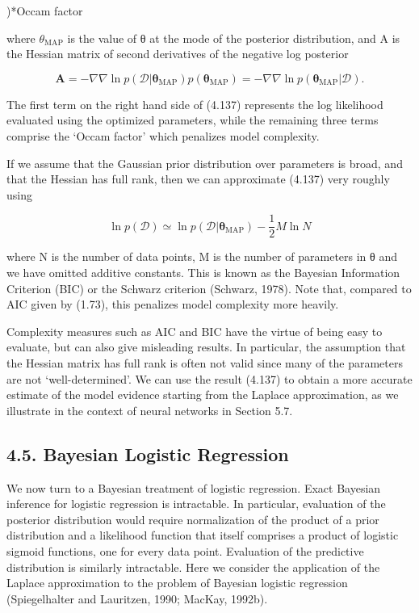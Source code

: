 \documentclass[
  10
]{article}
\begin{document}
)*Occam factor

where \(\theta _ { \mathrm { M A P } }\) is the value of θ at the mode
of the posterior distribution, and A is the Hessian matrix of second
derivatives of the negative log posterior

\[
\mathbf {A} = - \nabla \nabla \ln p (\mathcal {D} | \boldsymbol {\theta} _ {\mathrm{MAP}}) p (\boldsymbol {\theta} _ {\mathrm{MAP}}) = - \nabla \nabla \ln p (\boldsymbol {\theta} _ {\mathrm{MAP}} | \mathcal {D}).\tag{4.138}
\]

The first term on the right hand side of (4.137) represents the log
likelihood evaluated using the optimized parameters, while the remaining
three terms comprise the `Occam factor' which penalizes model
complexity.

If we assume that the Gaussian prior distribution over parameters is
broad, and that the Hessian has full rank, then we can approximate
(4.137) very roughly using

\[
\ln p (\mathcal {D}) \simeq \ln p (\mathcal {D} | \pmb {\theta} _ {\mathrm{MAP}}) - \frac {1}{2} M \ln N\tag{4.139}
\]

where N is the number of data points, M is the number of parameters in θ
and we have omitted additive constants. This is known as the Bayesian
Information Criterion (BIC) or the Schwarz criterion (Schwarz, 1978).
Note that, compared to AIC given by (1.73), this penalizes model
complexity more heavily.

Complexity measures such as AIC and BIC have the virtue of being easy to
evaluate, but can also give misleading results. In particular, the
assumption that the Hessian matrix has full rank is often not valid
since many of the parameters are not `well-determined'. We can use the
result (4.137) to obtain a more accurate estimate of the model evidence
starting from the Laplace approximation, as we illustrate in the context
of neural networks in Section 5.7.

\subsection{4.5. Bayesian Logistic
Regression}\label{bayesian-logistic-regression}

We now turn to a Bayesian treatment of logistic regression. Exact
Bayesian inference for logistic regression is intractable. In
particular, evaluation of the posterior distribution would require
normalization of the product of a prior distribution and a likelihood
function that itself comprises a product of logistic sigmoid functions,
one for every data point. Evaluation of the predictive distribution is
similarly intractable. Here we consider the application of the Laplace
approximation to the problem of Bayesian logistic regression
(Spiegelhalter and Lauritzen, 1990; MacKay, 1992b).
\end{document}
